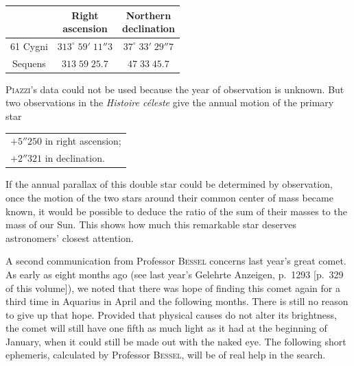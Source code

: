 \begin{center}
\fontsize{10}{12}\selectfont\setlength{\tabcolsep}{3pt}\renewcommand{\arraystretch}{1.15}\begin{tabular}{c|c|c}
 & \shortstack{Right\\ascension} & \shortstack{Northern\\declination} \\
\hline
61 Cygni & $313^\circ\;59'\;11''3$ & $37^\circ\;33'\;29''7$ \\
Sequens & $313\;59\;25.7$ & $47\;33\;45.7$ \\
\end{tabular}
\end{center}

\par\indent \textsc{Piazzi}’s data could not be used because the year of observation is unknown. But two observations in the \emph{Histoire céleste} give the annual motion of the primary star

\begin{center}\fontsize{10}{12}\selectfont\setlength{\tabcolsep}{0pt}\renewcommand{\arraystretch}{1.15}\begin{tabular}{l}
$+5''250$ in right ascension;\\$+2''321$ in declination.
\end{tabular}\end{center}
\noindent If the annual parallax of this double star could be determined by observation, once the motion of the two stars around their common center of mass became known, it would be possible to deduce the ratio of the sum of their masses to the mass of our Sun. This shows how much this remarkable star deserves astronomers’ closest attention.

\par\indent A second communication from Professor \textsc{Bessel} concerns last year’s great comet. As early as eight months ago (see last year’s Gelehrte Anzeigen, p.~1293 [p.~329 of this volume]), we noted that there was hope of finding this comet again for a third time in Aquarius in April and the following months. There is still no reason to give up that hope. Provided that physical causes do not alter its brightness, the comet will still have one fifth as much light as it had at the beginning of January, when it could still be made out with the naked eye. The following short ephemeris, calculated by Professor \textsc{Bessel}, will be of real help in the search.

